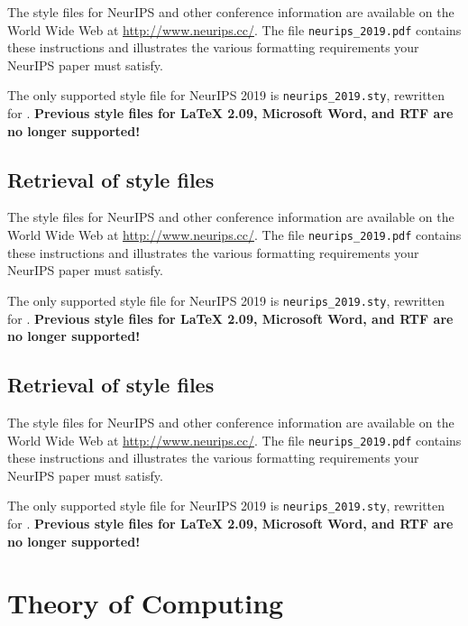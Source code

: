\documentclass{article}
\begin{document}
The style files for NeurIPS and other conference information are available on the World Wide Web at  \url{http://www.neurips.cc/}. The file \verb+neurips_2019.pdf+ contains these instructions and illustrates the various formatting requirements your NeurIPS paper must satisfy.

The only supported style file for NeurIPS 2019 is \verb+neurips_2019.sty+, rewritten for \LaTeXe{}. \textbf{Previous style files for \LaTeX{} 2.09,  Microsoft Word, and RTF are no longer supported!}


\subsection{Retrieval of style files}

The style files for NeurIPS and other conference information are available on the World Wide Web at  \url{http://www.neurips.cc/}. The file \verb+neurips_2019.pdf+ contains these instructions and illustrates the various formatting requirements your NeurIPS paper must satisfy.

The only supported style file for NeurIPS 2019 is \verb+neurips_2019.sty+, rewritten for \LaTeXe{}. \textbf{Previous style files for \LaTeX{} 2.09,  Microsoft Word, and RTF are no longer supported!}


\subsection{Retrieval of style files}

The style files for NeurIPS and other conference information are available on the World Wide Web at  \url{http://www.neurips.cc/}. The file \verb+neurips_2019.pdf+ contains these instructions and illustrates the various formatting requirements your NeurIPS paper must satisfy.

The only supported style file for NeurIPS 2019 is \verb+neurips_2019.sty+, rewritten for \LaTeXe{}. \textbf{Previous style files for \LaTeX{} 2.09,  Microsoft Word, and RTF are no longer supported!}



\section{Theory of Computing}
\end{document}
